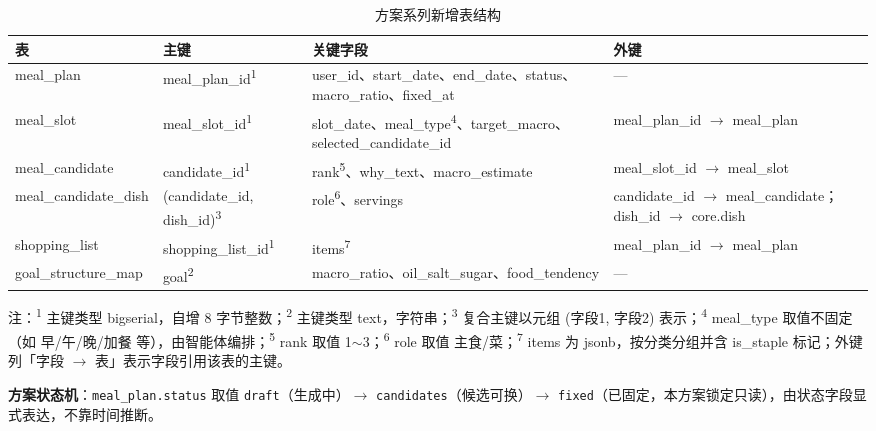 \documentclass[12pt,a4paper]{ctexart}
\begin{document}
{\footnotesize\setlength{\tabcolsep}{3pt}\begin{xltabular}{\linewidth}{Q{4cm}Q{3.6cm}Q{4.6cm}L}
\caption{方案系列新增表结构} \\
\toprule
\textbf{表} & \textbf{主键} & \textbf{关键字段} & \textbf{外键} \\
\midrule
\endhead
meal\_plan & meal\_plan\_id\textsuperscript{1} & user\_id、start\_date、end\_date、status、macro\_ratio、fixed\_at & --- \\
meal\_slot & meal\_slot\_id\textsuperscript{1} & slot\_date、meal\_type\textsuperscript{4}、target\_macro、selected\_candidate\_id & meal\_plan\_id $\rightarrow$ meal\_plan \\
meal\_candidate & candidate\_id\textsuperscript{1} & rank\textsuperscript{5}、why\_text、macro\_estimate & meal\_slot\_id $\rightarrow$ meal\_slot \\
meal\_candidate\_dish & (candidate\_id, dish\_id)\textsuperscript{3} & role\textsuperscript{6}、servings & candidate\_id $\rightarrow$ meal\_candidate；dish\_id $\rightarrow$ core.dish \\
shopping\_list & shopping\_list\_id\textsuperscript{1} & items\textsuperscript{7} & meal\_plan\_id $\rightarrow$ meal\_plan \\
goal\_structure\_map & goal\textsuperscript{2} & macro\_ratio、oil\_salt\_sugar、food\_tendency & --- \\
\bottomrule
\end{xltabular}}

{\footnotesize 注：\textsuperscript{1} 主键类型 bigserial，自增 8 字节整数；\textsuperscript{2} 主键类型 text，字符串；\textsuperscript{3} 复合主键以元组 (字段1, 字段2) 表示；\textsuperscript{4} meal\_type 取值不固定（如 早/午/晚/加餐 等），由智能体编排；\textsuperscript{5} rank 取值 1$\sim$3；\textsuperscript{6} role 取值 主食/菜；\textsuperscript{7} items 为 jsonb，按分类分组并含 is\_staple 标记；外键列「字段 $\rightarrow$ 表」表示字段引用该表的主键。}

\textbf{方案状态机}：\texttt{meal\_plan.status} 取值 \texttt{draft}（生成中）$\rightarrow$ \texttt{candidates}（候选可换）$\rightarrow$ \texttt{fixed}（已固定，本方案锁定只读），由状态字段显式表达，不靠时间推断。
\vspace{-1em}
\end{document}
